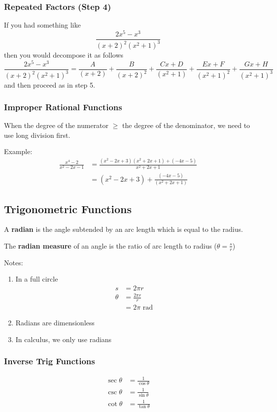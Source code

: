 \documentclass[12pt]{article}
\begin{document}
\subsubsection*{Repeated Factors (Step 4)}
If you had something like \[ \frac{2x^5-x^3}{(x+2)^2(x^2+1)^3} \] then you would decompose it as follows \[ \frac{2x^5-x^3}{(x+2)^2(x^2+1)^3} = \frac{A}{(x+2)}+\frac{B}{(x+2)^2}+\frac{Cx+D}{(x^2+1)}+\frac{Ex+F}{(x^2+1)^2}+\frac{Gx+H}{(x^2+1)^3} \] and then proceed as in step 5.

\subsubsection*{Improper Rational Functions}
When the degree of the numerator $\geq$ the degree of the denominator, we need to use long division first.

Example:
\begin{align*}
\frac{x^4-2}{x^2-2x-1} &= \frac{(x^2-2x+3)(x^2+2x+1)+(-4x-5)}{x^2+2x+1}\\
&= (x^2-2x+3) + \frac{(-4x-5)}{(x^2+2x+1)}
\end{align*}

\subsection*{Trigonometric Functions}
A {\bf radian} is the angle subtended by an arc length which is equal to the radius.

The {\bf radian measure} of an angle is the ratio of arc length to radius ($\theta = \frac{s}{r}$)

Notes:
\begin{enumerate}
\item In a full circle \begin{align*}
                         s &= 2\pi r\\
                         \theta &= \frac{2\pi r}{r}\\
                         &= 2\pi \text{ rad}
                       \end{align*}
\item Radians are dimensionless
\item In calculus, we only use radians
\end{enumerate}

\subsubsection*{Inverse Trig Functions}
\begin{align*}
\sec\theta &= \frac{1}{\cos\theta}\\
\csc\theta &= \frac{1}{\sin\theta}\\
\cot\theta &= \frac{1}{\tan\theta}
\end{align*}
\end{document}
